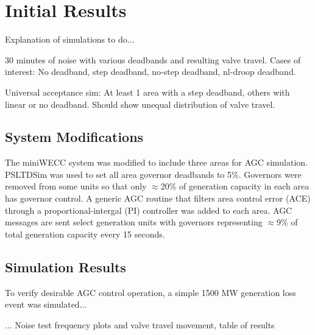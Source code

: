 \section{Initial Results}
Explanation of simulations to do...

30 minutes of noise with various deadbands and resulting valve travel.
Cases of interest:
No deadband, step deadband, no-step deadband, nl-droop deadband.

Universal acceptance sim:
At least 1 area with a step deadband, others with linear or no deadband.
Should show unequal distribution of valve travel.

\subsection{System Modifications}
The miniWECC system was modified to include three areas for AGC simulation.
PSLTDSim was used to set all area governor deadbands to 5\%.
Governors were removed from some units so that only $\approx$20\% of generation capacity in each area has governor control.
A generic AGC routine that filters area control error (ACE) through a proportional-intergal (PI)  controller was added to each area.
AGC messages are sent select generation units with governors representing $\approx$9\% of total generation capacity every 15 seconds.

\subsection{Simulation Results}
To verify desirable AGC control operation, a simple 1500 MW generation loss event was simulated...

...
Noise test frequency plots and valve travel movement, table of results